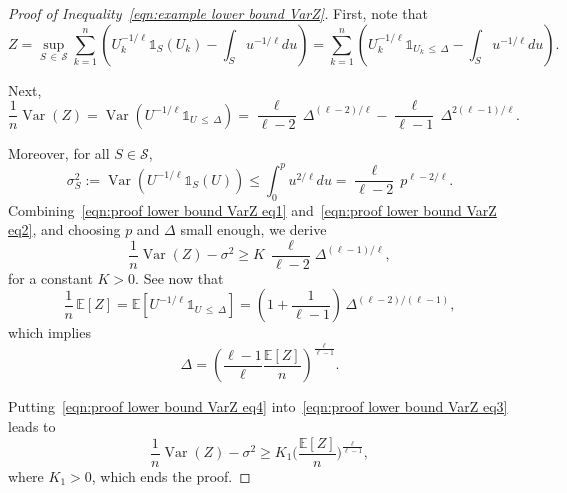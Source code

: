 \documentclass[10pt]{amsart}
\theoremstyle{definition}\newtheorem{defi}[theo]{Definition}\newtheorem{rema}[theo]{Remark}\newtheorem{exam}[theo]{Example}\newtheorem{exem}[theo]{Example}\newtheorem{nota}[theo]{Notation}
\DeclareMathOperator{\Var}{Var}
\newcommand{\bE}{\mathbb{E}}
\newcommand{\cS}{\mathcal{S}}
\newcommand{\ind}{\mathds{1}}
\begin{document}
\begin{proof}[Proof of Inequality~\eqref{eqn:example lower bound VarZ}]
First, note that
\[
Z=\sup_{S\,\in\,\cS}\sum_{k=1}^n\left(U_k^{-1/\ell}\ind_S(U_k)-\int_S u^{-1/\ell}du\right)=\sum_{k=1}^n\left(U_k^{-1/\ell}\ind_{U_k\,\leq\,\Delta}-\int_S u^{-1/\ell}du\right).
\]

Next,
\begin{equation}\label{eqn:proof lower bound VarZ eq1}
\frac 1n\Var(Z)=\Var\left(U^{-1/\ell}\ind_{U\,\leq\,\Delta}\right)=\frac{\ell}{\ell-2}\,\Delta^{(\ell-2)/\ell}-\frac{\ell}{\ell-1}\,\Delta^{2(\ell-1)/\ell}.
\end{equation}

Moreover, for all $S\in\cS$,
\begin{equation}\label{eqn:proof lower bound VarZ eq2}
\sigma_S^2 :=\Var\left(U^{-1/\ell}\ind_S(U)\right)\leq\int_0^p u^{2/\ell}du=\frac{\ell}{\ell-2}\,p^{\ell-2/\ell}.
\end{equation}
Combining~\eqref{eqn:proof lower bound VarZ eq1} and~\eqref{eqn:proof lower bound VarZ eq2}, and choosing $p$ and $\Delta$ small enough, we derive
\begin{equation}\label{eqn:proof lower bound VarZ eq3}
\frac 1n \Var(Z)-\sigma^2 \geq K\,\frac{\ell}{\ell-2}\Delta^{(\ell-1)/\ell},
\end{equation}
for a constant $K>0$. See now that
\begin{equation}
\frac 1n\,\bE[Z]=\bE\left[U^{-1/\ell}\ind_{U\,\leq\,\Delta}\right]=\left(1+\frac {1}{\ell-1}\right)\,\Delta^{(\ell-2)/(\ell-1)},
\end{equation}
which implies
\begin{equation}\label{eqn:proof lower bound VarZ eq4}
\Delta=\left(\frac{\ell-1}{\ell} \frac{\bE[Z]}{n}\right)^{\frac{\ell}{\ell-1}}.
\end{equation}

Putting~\eqref{eqn:proof lower bound VarZ eq4} into~\eqref{eqn:proof lower bound VarZ eq3} leads to
\begin{equation}
\frac 1n \Var(Z)-\sigma^2 \geq K_1\Big(\frac{\bE[Z]}{n}\Big)^{\frac{\ell}{\ell-1}},
\end{equation}
where $K_1>0$, which ends the proof.
\end{proof}
\end{document}
